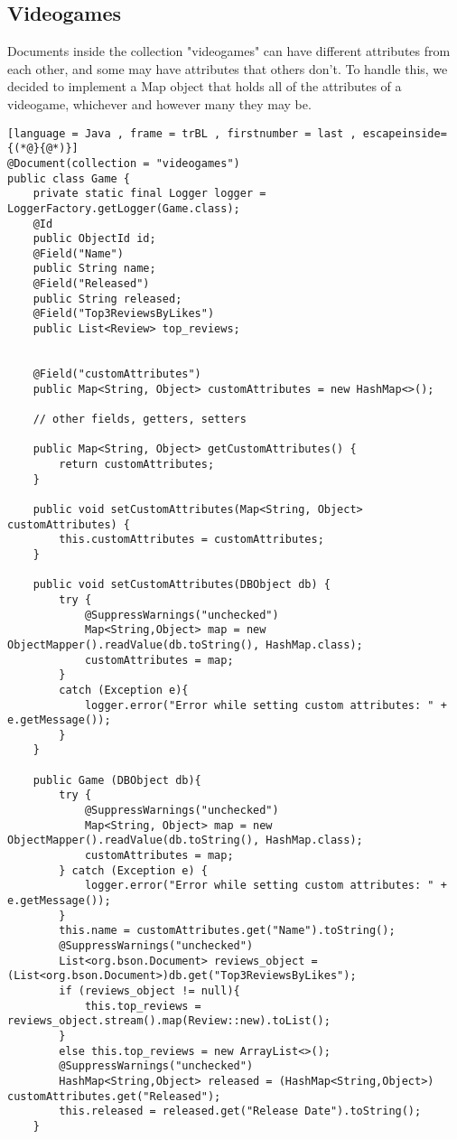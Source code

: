 \subsection{Videogames}
Documents inside the collection "videogames" can have different attributes from each other, and some may have attributes that others don't. To handle this, we decided to implement a Map object that holds all of the attributes of a videogame, whichever and however many they may be.
\begin{lstlisting}[language = Java , frame = trBL , firstnumber = last , escapeinside={(*@}{@*)}]
@Document(collection = "videogames")
public class Game {
	private static final Logger logger = LoggerFactory.getLogger(Game.class);
    @Id
    public ObjectId id;
    @Field("Name")
    public String name;
    @Field("Released")
    public String released;
    @Field("Top3ReviewsByLikes")
    public List<Review> top_reviews;


    @Field("customAttributes")
    public Map<String, Object> customAttributes = new HashMap<>();

    // other fields, getters, setters

    public Map<String, Object> getCustomAttributes() {
        return customAttributes;
    }

    public void setCustomAttributes(Map<String, Object> customAttributes) {
        this.customAttributes = customAttributes;
    }

    public void setCustomAttributes(DBObject db) {
        try {
            @SuppressWarnings("unchecked")
            Map<String,Object> map = new ObjectMapper().readValue(db.toString(), HashMap.class);
            customAttributes = map;
        }
        catch (Exception e){
            logger.error("Error while setting custom attributes: " + e.getMessage());
        }
    }

    public Game (DBObject db){
        try {
            @SuppressWarnings("unchecked")
            Map<String, Object> map = new ObjectMapper().readValue(db.toString(), HashMap.class);
            customAttributes = map;
        } catch (Exception e) {
            logger.error("Error while setting custom attributes: " + e.getMessage());
        }
        this.name = customAttributes.get("Name").toString();
        @SuppressWarnings("unchecked")
        List<org.bson.Document> reviews_object = (List<org.bson.Document>)db.get("Top3ReviewsByLikes");
        if (reviews_object != null){
            this.top_reviews = reviews_object.stream().map(Review::new).toList();
        }
        else this.top_reviews = new ArrayList<>();
        @SuppressWarnings("unchecked")
        HashMap<String,Object> released = (HashMap<String,Object>) customAttributes.get("Released");
        this.released = released.get("Release Date").toString();
    }


\end{lstlisting}
